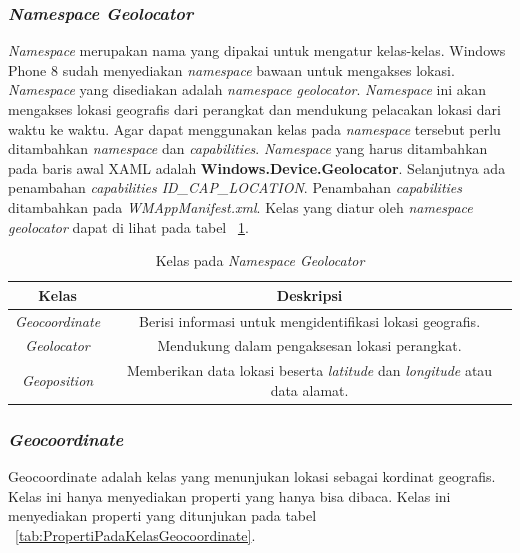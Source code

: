 \subsubsection{\textit{Namespace Geolocator}}
\label{subsubsec:Namespace Geolocator}
\hspace{0.5cm} \textit{Namespace} merupakan nama yang dipakai untuk mengatur kelas-kelas. Windows Phone 8 sudah menyediakan \textit{namespace} bawaan untuk mengakses lokasi. \textit{Namespace} yang disediakan adalah \textit{namespace geolocator}. \textit{Namespace} ini akan mengakses lokasi geografis dari perangkat dan mendukung pelacakan lokasi dari waktu ke waktu. Agar dapat menggunakan kelas pada \textit{namespace} tersebut perlu ditambahkan \textit{namespace} dan \textit{capabilities}. \textit{Namespace} yang harus ditambahkan pada baris awal XAML adalah \textbf{Windows.Device.Geolocator}. Selanjutnya ada penambahan \textit{capabilities ID\_CAP\_LOCATION}. Penambahan \textit{capabilities} ditambahkan pada \textit{WMAppManifest.xml}. Kelas yang diatur oleh \textit{namespace geolocator} dapat di lihat pada tabel ~\ref{tab:KelasPadaNamespaceGeolocator}.
\begin{table}[h]
	\centering
		\begin{tabular}{ |c|c|}
				\hline
				Kelas & Deskripsi \\ \hline
				\textit{Geocoordinate} & Berisi informasi untuk mengidentifikasi lokasi geografis. \\ \hline
				\textit{Geolocator} & Mendukung dalam pengaksesan lokasi perangkat. \\ \hline
				\textit{Geoposition} & Memberikan data lokasi beserta \textit{latitude} dan \textit{longitude} atau data alamat. \\ \hline
				\hline
		\end{tabular}
	\caption{Kelas pada \textit{Namespace Geolocator}}
	\label{tab:KelasPadaNamespaceGeolocator}
\end{table}

\subsubsection{\textit{Geocoordinate}}
\label{subsubsec:Kelas Geocoordinate}
\hspace{0.5cm} Geocoordinate adalah kelas yang menunjukan lokasi sebagai kordinat geografis. Kelas ini hanya menyediakan properti yang hanya bisa dibaca. Kelas ini menyediakan properti yang ditunjukan pada tabel ~\ref{tab:PropertiPadaKelasGeocoordinate}.

